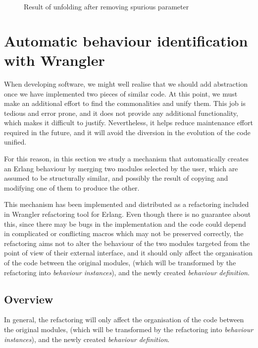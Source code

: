 \begin{figure}


\caption{Result of unfolding after removing spurious parameter\label{fig:final_result}}
\end{figure}

\section{Automatic behaviour identification with Wrangler}
\label{sec:identification}

When developing software, we might well realise that we should add
abstraction once we have implemented two pieces of similar
code. At this point, we must make an additional effort to find the
commonalities and unify them. This job is tedious and error prone,
and it does not provide any additional functionality, which makes
it difficult to justify. Nevertheless, it helps reduce maintenance
effort required in the future, and it will avoid the diversion in
the evolution of the code unified.

For this reason, in this section we study a mechanism that automatically
creates an Erlang behaviour by merging two modules selected by the
user, which are assumed to be structurally similar, and possibly the
result of copying and modifying one of them to produce the other.

This mechanism has been implemented and distributed as a refactoring
included in Wrangler refactoring tool for Erlang. Even though there is no
guarantee about this, since there may be bugs in the implementation and
the code could depend in complicated or conflicting macros which may
not be preserved correctly, the refactoring aims not to alter the behaviour
of the two modules targeted from the point of view of their external
interface, and it should only affect the organisation of the code
between the original modules, (which will be transformed by the refactoring
into \emph{behaviour instances}), and the newly created \emph{behaviour
definition}.

\subsection{Overview}

In general, the refactoring will only affect the organisation
of the code between the original modules, (which will be transformed by
the refactoring into \emph{behaviour instances}), and the newly created
\emph{behaviour definition}.

